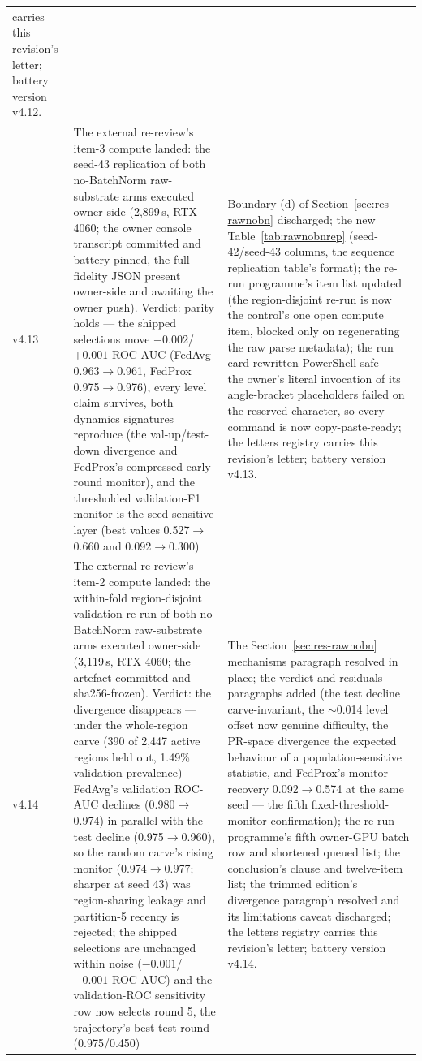 \begin{longtable}{@{}p{} >{\raggedright\arraybackslash}p{} >{\raggedright\arraybackslash}p{}@{}}
carries this revision's letter; battery version v4.12. \\
v4.13 & The external re-review's item-3 compute landed: the seed-43
replication of both no-BatchNorm raw-substrate arms executed
owner-side (2{,}899\,s, RTX 4060; the owner console transcript
committed and battery-pinned, the full-fidelity JSON present
owner-side and awaiting the owner push). Verdict: parity holds ---
the shipped selections move $-0.002$/$+0.001$ ROC-AUC (FedAvg
0.963$\to$0.961, FedProx 0.975$\to$0.976), every level claim
survives, both dynamics signatures reproduce (the val-up/test-down
divergence and FedProx's compressed early-round monitor), and the
thresholded validation-F1 monitor is the seed-sensitive layer
(best values 0.527$\to$0.660 and 0.092$\to$0.300) & Boundary (d)
of Section~\ref{sec:res-rawnobn} discharged; the new
Table~\ref{tab:rawnobnrep} (seed-42/seed-43 columns, the sequence
replication table's format); the re-run programme's item list
updated (the region-disjoint re-run is now the control's one open
compute item, blocked only on regenerating the raw parse metadata);
the run card rewritten PowerShell-safe --- the owner's literal
invocation of its angle-bracket placeholders failed on the reserved
character, so every command is now copy-paste-ready; the letters
registry carries this revision's letter; battery version v4.13. \\
v4.14 & The external re-review's item-2 compute landed: the
within-fold region-disjoint validation re-run of both no-BatchNorm
raw-substrate arms executed owner-side (3{,}119\,s, RTX 4060; the
artefact committed and sha256-frozen). Verdict: the divergence
disappears --- under the whole-region carve (390 of 2{,}447 active
regions held out, 1.49\% validation prevalence) FedAvg's validation
ROC-AUC declines (0.980$\to$0.974) in parallel with the test
decline (0.975$\to$0.960), so the random carve's rising monitor
(0.974$\to$0.977; sharper at seed 43) was region-sharing leakage
and partition-5 recency is rejected; the shipped selections are
unchanged within noise ($-0.001$/$-0.001$ ROC-AUC) and the
validation-ROC sensitivity row now selects round 5, the
trajectory's best test round (0.975/0.450) & The
Section~\ref{sec:res-rawnobn} mechanisms paragraph resolved in
place; the verdict and residuals paragraphs added (the test decline
carve-invariant, the $\sim$0.014 level offset now genuine
difficulty, the PR-space divergence the expected behaviour of a
population-sensitive statistic, and FedProx's monitor recovery
0.092$\to$0.574 at the same seed --- the fifth
fixed-threshold-monitor confirmation); the re-run programme's
fifth owner-GPU batch row and shortened queued list; the
conclusion's clause and twelve-item list; the trimmed edition's
divergence paragraph resolved and its limitations caveat
discharged; the letters registry carries this revision's letter;
battery version v4.14. \\
\end{longtable}
\endgroup

